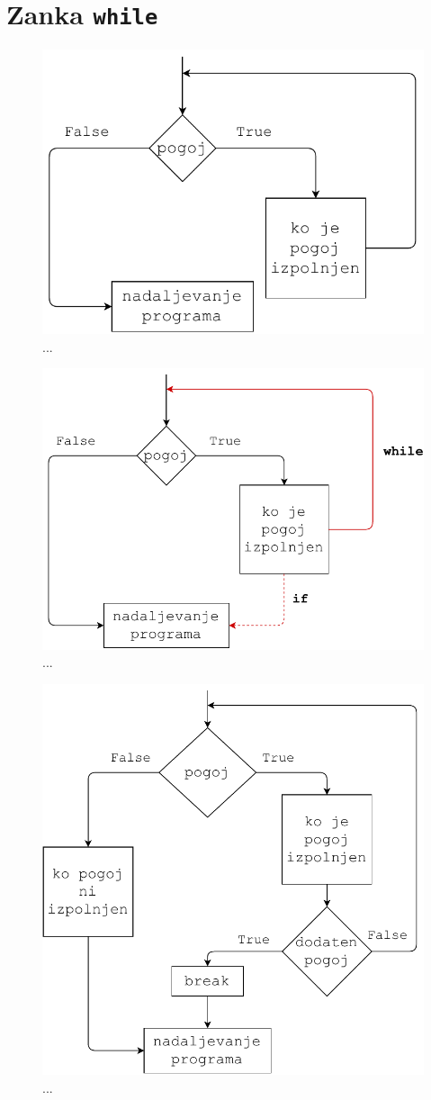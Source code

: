 \chapter{Zanka \texttt{while}}

\begin{figure}
    \centering
    \includegraphics[width=0.5\linewidth]{img/while1.pdf}
    \caption{...}
    \label{img:while1}
\end{figure}

\begin{figure}
    \centering
    \includegraphics[width=0.5\linewidth]{img/while_vs_if.pdf}
    \caption{...}
    \label{img:while_vs_if}
\end{figure}

\begin{figure}
    \centering
    \includegraphics[width=0.5\linewidth]{img/while2.pdf}
    \caption{...}
    \label{img:while2}
\end{figure}